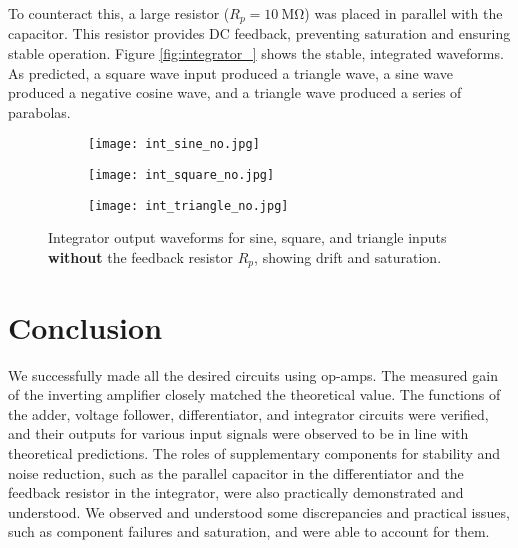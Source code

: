 \documentclass[12pt,a4paper]{article}
\begin{document}
To counteract this, a large resistor (\(R_p = \SI{10}{\mega\ohm}\)) was placed in parallel with the capacitor. This resistor provides DC feedback, preventing saturation and ensuring stable operation. Figure \ref{fig:integrator_} shows the stable, integrated waveforms. As predicted, a square wave input produced a triangle wave, a sine wave produced a negative cosine wave, and a triangle wave produced a series of parabolas.

\begin{figure}[H]
    \centering
    \begin{subfigure}[b]{0.32\linewidth}
        \texttt{[image: int\_sine\_no.jpg]} 
    \end{subfigure}
    \begin{subfigure}[b]{0.32\linewidth}
        \texttt{[image: int\_square\_no.jpg]} 
    \end{subfigure}
    \begin{subfigure}[b]{0.32\linewidth}
        \texttt{[image: int\_triangle\_no.jpg]} 
    \end{subfigure}
    \caption{Integrator output waveforms for sine, square, and triangle inputs \textbf{without} the feedback resistor \(R_p\), showing drift and saturation.}
    \label{fig:integrator_no}
\end{figure}


\section{Conclusion}
We successfully made all the desired circuits using op-amps. The measured gain of the inverting amplifier closely matched the theoretical value. The functions of the adder, voltage follower, differentiator, and integrator circuits were verified, and their outputs for various input signals were observed to be in line with theoretical predictions. The roles of supplementary components for stability and noise reduction, such as the parallel capacitor in the differentiator and the feedback resistor in the integrator, were also practically demonstrated and understood. We observed and understood some discrepancies and practical issues, such as component failures and saturation, and were able to account for them.
\end{document}
